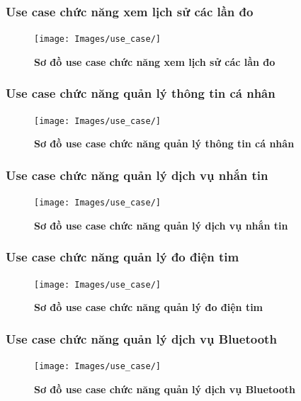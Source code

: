 \documentclass{article}%
\begin{document}
\subsubsection{Use case chức năng xem lịch sử các lần đo}
  \begin{figure}[H]
    \centering
    \texttt{[image: Images/use\_case/]}
    \caption[Sơ đồ use case chức năng xem lịch sử các lần đo]{\bfseries \fontsize{12pt}{0pt}
    \selectfont Sơ đồ use case chức năng xem lịch sử các lần đo}
    \label{hinh21} %
  \end{figure}

\subsubsection{Use case chức năng quản lý thông tin cá nhân}
  \begin{figure}[H]
    \centering
    \texttt{[image: Images/use\_case/]}
    \caption[Sơ đồ use case chức năng quản lý thông tin cá nhân]{\bfseries \fontsize{12pt}{0pt}
    \selectfont Sơ đồ use case chức năng quản lý thông tin cá nhân}
    \label{hinh21} %
  \end{figure}

\subsubsection{Use case chức năng quản lý dịch vụ nhắn tin}
  \begin{figure}[H]
    \centering
    \texttt{[image: Images/use\_case/]}
    \caption[Sơ đồ use case chức năng quản lý dịch vụ nhắn tin]{\bfseries \fontsize{12pt}{0pt}
    \selectfont Sơ đồ use case chức năng quản lý dịch vụ nhắn tin}
    \label{hinh21} %
  \end{figure}

\subsubsection{Use case chức năng quản lý đo điện tim}
  \begin{figure}[H]
    \centering
    \texttt{[image: Images/use\_case/]}
    \caption[Sơ đồ use case chức năng quản lý đo điện tim]{\bfseries \fontsize{12pt}{0pt}
    \selectfont Sơ đồ use case chức năng quản lý đo điện tim}
    \label{hinh21} %
  \end{figure}
\subsubsection{Use case chức năng quản lý dịch vụ Bluetooth}
  \begin{figure}[H]
    \centering
    \texttt{[image: Images/use\_case/]}
    \caption[Sơ đồ use case chức năng quản lý dịch vụ Bluetooth]{\bfseries \fontsize{12pt}{0pt}
    \selectfont Sơ đồ use case chức năng quản lý dịch vụ Bluetooth}
    \label{hinh21} %
  \end{figure}
\end{document}
